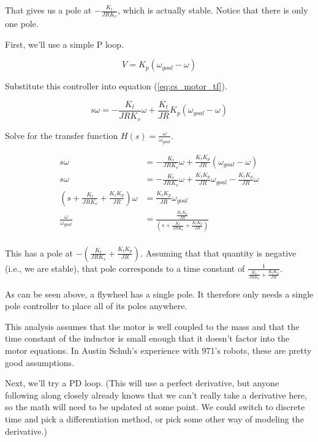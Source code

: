 That gives us a pole at $-\frac{K_t}{JRK_v}$, which is actually stable. Notice
that there is only one pole.

First, we'll use a simple P loop.

\begin{equation*}
  V = K_p (\omega_{goal} - \omega)
\end{equation*}

Substitute this controller into equation (\ref{eq:cs_motor_tf}).

\begin{equation*}
  s \omega = -\frac{K_t}{JRK_v} \omega + \frac{K_t}{JR} K_p (\omega_{goal} -
    \omega)
\end{equation*}

Solve for the transfer function $H(s) = \frac{\omega}{\omega_{goal}}$.

\begin{align*}
  s \omega &= -\frac{K_t}{JRK_v} \omega + \frac{K_t K_p}{JR} (\omega_{goal} -
    \omega) \\
  s \omega &= -\frac{K_t}{JRK_v} \omega + \frac{K_t K_p}{JR} \omega_{goal} -
    \frac{K_t K_p}{JR} \omega \\
  \left(s + \frac{K_t}{JRK_v} + \frac{K_t K_p}{JR}\right) \omega &=
    \frac{K_t K_p}{JR} \omega_{goal} \\
  \frac{\omega}{\omega_{goal}} &= \frac{\frac{K_t K_p}{JR}}
    {\left(s + \frac{K_t}{JRK_v} + \frac{K_t K_p}{JR}\right)} \\
\end{align*}

This has a pole at $-\left(\frac{K_t}{JRK_v} + \frac{K_t K_p}{JR}\right)$.
Assuming that that quantity is negative (i.e., we are stable), that pole
corresponds to a time constant of
$\frac{1}{\frac{K_t}{JRK_v} + \frac{K_t K_p}{JR}}$.

As can be seen above, a flywheel has a single pole. It therefore only needs a
single pole controller to place all of its poles anywhere.

\begin{remark}
  This analysis assumes that the motor is well coupled to the mass and that the
  time constant of the inductor is small enough that it doesn't factor into the
  motor equations. In Austin Schuh's experience with 971's robots, these are
  pretty good assumptions.
\end{remark}

Next, we'll try a PD loop. (This will use a perfect derivative, but anyone
following along closely already knows that we can't really take a derivative
here, so the math will need to be updated at some point. We could switch to
discrete time and pick a differentiation method, or pick some other way of
modeling the derivative.)

